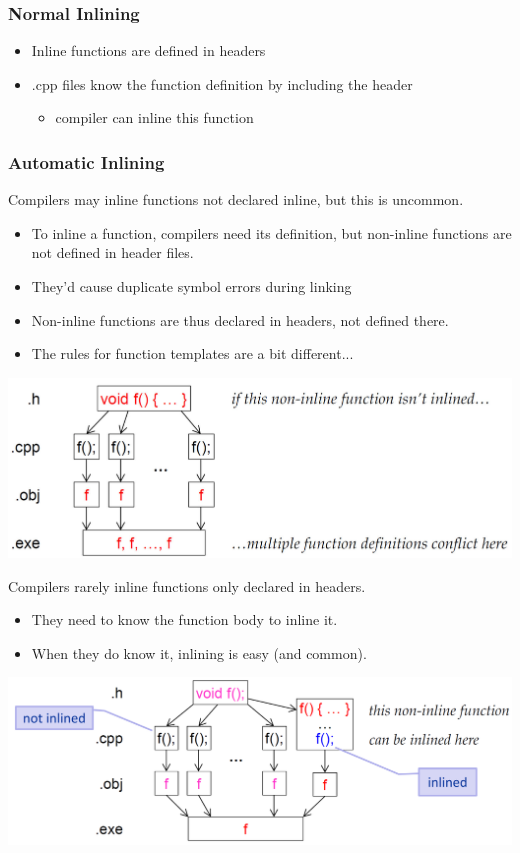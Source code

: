 \subsubsection{Normal Inlining}
\begin{itemize}
	\item Inline functions are defined in headers
	\item .cpp files know the function definition by including the header
	\begin{itemize}
		\item compiler can inline this function
	\end{itemize}
\end{itemize}

\subsubsection{Automatic Inlining}
\begin{multicols}{2}
Compilers may inline functions not declared inline, but this is uncommon.
\begin{itemize}
	\item To inline a function, compilers need its definition, but non-inline functions are not defined in header files.
	\item They'd cause duplicate symbol errors during linking
	\item Non-inline functions are thus declared in headers, not defined there.
	\item The rules for function templates are a bit different...
\end{itemize}
\vfill\null
\columnbreak
\includegraphics[width=\linewidth]{images/AdvancedCPP/automaticInline}
\end{multicols}
\begin{multicols}{2}
Compilers rarely inline functions only declared in headers.
\begin{itemize}
	\item They need to know the function body to inline it.
	\item When they do know it, inlining is easy (and common).
\end{itemize}
\vfill\null
\columnbreak
\includegraphics[width=\linewidth]{images/AdvancedCPP/automaticInline2}
\end{multicols}

